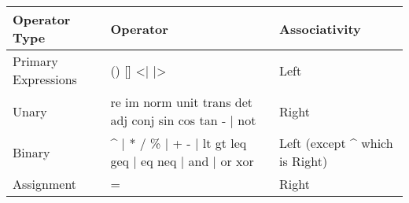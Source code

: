 \begin{flushleft}
\begin{tabular}{|l|l|l|}
	\hline    
	                   
	Operator Type & 
	Operator & 
	Associativity\\
	
	\hline
	Primary Expressions &
	\textsf{() [] <| |>} &
	Left\\
	Unary & 
	\textsf{re im norm unit trans det adj conj sin cos tan - $|$ not} & 
	Right\\
	Binary & 
	\textsf{\string^ $|$ * / \% $|$ + - $|$ lt gt leq geq $|$ eq neq $|$ and $|$ or xor } &
	Left (except \string^ which is Right)\\
	Assignment &
	\textsf{=} 
	& Right\\
	
	\hline  
\end{tabular}
\end{flushleft}
